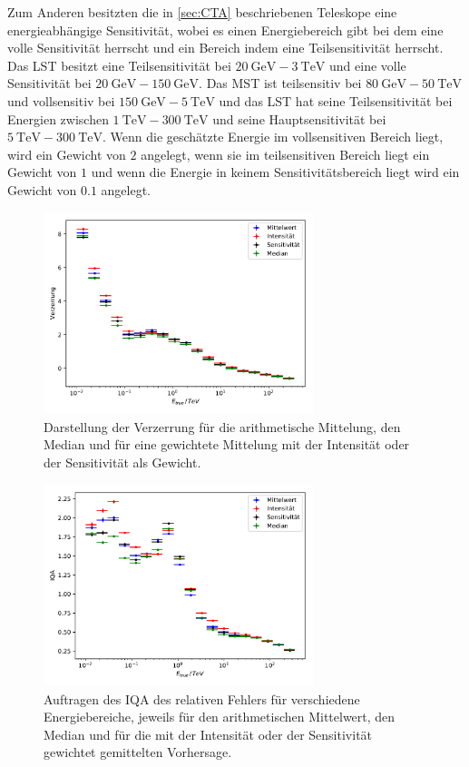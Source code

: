Zum Anderen besitzten die in \autoref{sec:CTA} beschriebenen Teleskope eine energieabhängige Sensitivität, wobei
es einen Energiebereich gibt bei dem eine volle Sensitivität herrscht und ein Bereich indem eine Teilsensitivität
herrscht.
Das LST besitzt eine Teilsensitivität bei $\SI{20}{\giga\eV}-\SI{3}{\tera\eV}$ und eine volle Sensitivität bei
$\SI{20}{\giga\eV}-\SI{150}{\giga\eV}$.
Das MST ist teilsensitiv bei $\SI{80}{\giga\eV}-\SI{50}{\tera\eV}$ und vollsensitiv bei $\SI{150}{\giga\eV}-\SI{5}{\tera\eV}$
und das LST hat seine Teilsensitivität bei Energien zwischen $\SI{1}{\tera\eV}-\SI{300}{\tera\eV}$ und seine
Hauptsensitivität bei $\SI{5}{\tera\eV}-\SI{300}{\tera\eV}$.\cite{CTA_tec}
Wenn die geschätzte Energie im vollsensitiven Bereich liegt, wird ein Gewicht von $2$ angelegt, wenn sie im
teilsensitiven Bereich liegt ein Gewicht von $1$ und wenn die Energie in keinem Sensitivitätsbereich liegt
wird ein Gewicht von $0.1$ angelegt.
\begin{figure}
  \includegraphics[width=0.7\textwidth]{Plots/RF_weights_bias.pdf}
  \centering
  \caption{Darstellung der Verzerrung für die arithmetische Mittelung, den Median und für eine gewichtete Mittelung mit der Intensität
            oder der Sensitivität als Gewicht.}
  \label{abb:w_bias}
\end{figure}
\begin{figure}
  \includegraphics[width=0.7\textwidth]{Plots/RF_weights_resolution.pdf}
  \centering
  \caption{Auftragen des IQA des relativen Fehlers für verschiedene Energiebereiche, jeweils für den arithmetischen Mittelwert, den Median und
            für die mit der Intensität oder der Sensitivität gewichtet gemittelten Vorhersage.}
  \label{abb:w_IQA}
\end{figure}

